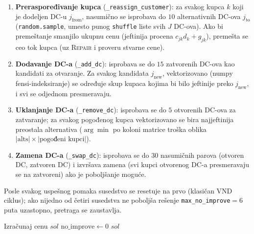 \documentclass[12pt,a4paper]{article}
\begin{document}
\begin{enumerate}
  \item \textbf{Preraspoređivanje kupca} (\texttt{\_reassign\_customer}):
    za svakog kupca $k$ koji je dodeljen DC-u $j_{\text{from}}$,
    nasumično se isprobava do $10$ alternativnih DC-ova $j_{\text{to}}$
    (\texttt{random.sample}, umesto punog \texttt{shuffle} liste svih $J$
    DC-ova). Ako bi premeštanje smanjilo ukupnu cenu (jeftinija procena
    $c_{jk}d_k + g_{jk}$), premešta se ceo tok kupca (uz \textsc{Repair}
    i proveru stvarne cene).

  \item \textbf{Dodavanje DC-a} (\texttt{\_add\_dc}):
    isprobava se do $15$ zatvorenih DC-ova kao kandidati za otvaranje.
    Za svakog kandidata $j_{\text{new}}$, vektorizovano (numpy fensi-indeksiranje)
    se određuje skup kupaca kojima bi bilo jeftinije preko $j_{\text{new}}$,
    i svi se odjednom presmeravaju.

  \item \textbf{Uklanjanje DC-a} (\texttt{\_remove\_dc}):
    isprobava se do $5$ otvorenih DC-ova za zatvaranje; za svakog pogođenog
    kupca vektorizovano se bira najjeftinija preostala alternativa
    ($\arg\min$ po koloni matrice troška oblika $|\text{alts}| \times |\text{pogođeni kupci}|$).

  \item \textbf{Zamena DC-a} (\texttt{\_swap\_dc}):
    isprobava se do $30$ nasumičnih parova (otvoren DC, zatvoren DC) i
    izvršava zamena (svi kupci otvorenog DC-a presmeravaju se na zatvoreni)
    ako je poboljšanje moguće.
\end{enumerate}

Posle svakog uspešnog pomaka susedstvo se resetuje na prvo (klasičan VND
ciklus); ako nijedno od četiri susedstva ne poboljša rešenje
\texttt{max\_no\_improve}$=6$ puta uzastopno, pretraga se zaustavlja.

\begin{algorithm}[H]
\caption{VND$(D, sol, \text{max\_no\_improve}=6)$}
\SetAlgoLined
Izračunaj cenu $sol$\;
$\text{no\_improve} \leftarrow 0$\;
\Return $sol$
\end{algorithm}
\end{document}
